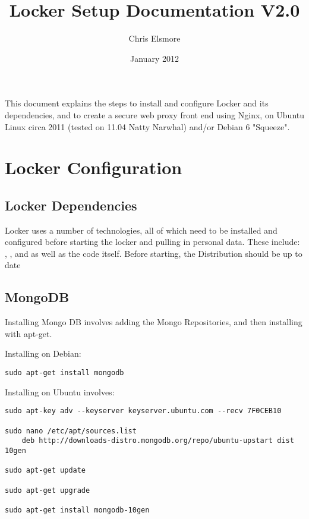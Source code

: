 \documentclass[A4paper,11pt]{article}
\title{Locker Setup Documentation V2.0}
\author{Chris Elsmore}
\date{January 2012}
\begin{document}
\maketitle

This document explains the steps to install and configure Locker and its dependencies, and to create a secure web proxy front end using Nginx, on Ubuntu Linux circa 2011 (tested on 11.04 Natty Narwhal) and/or Debian 6 "Squeeze".

\section{Locker Configuration}
\label{sec:LockerConfiguration}


\subsection{Locker Dependencies}
\label{subsec:LockerDepenedcies}

Locker uses a number of technologies, all of which need to be installed and configured before starting the locker and pulling in personal data. These include: , ,  and  as well as the  code itself. Before starting, the Distribution should be up to date

\subsection{MongoDB}
\label{subsec:MongoDB}

Installing Mongo DB involves adding the Mongo Repositories, and then installing with apt-get.

Installing on Debian:
\begin{lstlisting}
sudo apt-get install mongodb
\end{lstlisting}



Installing on Ubuntu involves:
\begin{lstlisting}
sudo apt-key adv --keyserver keyserver.ubuntu.com --recv 7F0CEB10

sudo nano /etc/apt/sources.list
    deb http://downloads-distro.mongodb.org/repo/ubuntu-upstart dist 10gen

sudo apt-get update

sudo apt-get upgrade

sudo apt-get install mongodb-10gen
\end{lstlisting}
\end{document}
